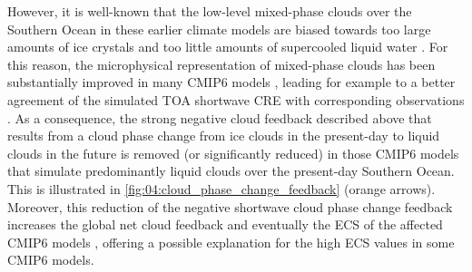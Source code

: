However, it is well-known that the low-level mixed-phase clouds over the
Southern Ocean in these earlier climate models are biased towards too large
amounts of ice crystals and too little amounts of supercooled liquid water
\autocite{BodasSalcedo2016, McCoy2015, McCoy2016, Tan2016}. For this reason,
the microphysical representation of mixed-phase clouds has been substantially
improved in many \acs{CMIP}6 models \autocite{BodasSalcedo2019, Gettelman2019,
  Mulcahy2020, Williams2020}, leading for example to a better agreement of the
simulated \ac{TOA} shortwave \ac{CRE} with corresponding observations
\autocite{Bock2020}. As a consequence, the strong negative cloud feedback
described above that results from a cloud phase change from ice clouds in the
present-day to liquid clouds in the future is removed (or significantly
reduced) in those \acs{CMIP}6 models that simulate predominantly liquid clouds
over the present-day Southern Ocean. This is illustrated in
\cref{fig:04:cloud_phase_change_feedback} (orange arrows). Moreover, this
reduction of the negative shortwave cloud phase change feedback increases the
global net cloud feedback \autocite{BodasSalcedo2019, Tan2016} and eventually
the \ac{ECS} of the affected \acs{CMIP}6 models \autocite{Andrews2019,
  Gettelman2019}, offering a possible explanation for the high \ac{ECS} values
in some \acs{CMIP}6 models.


